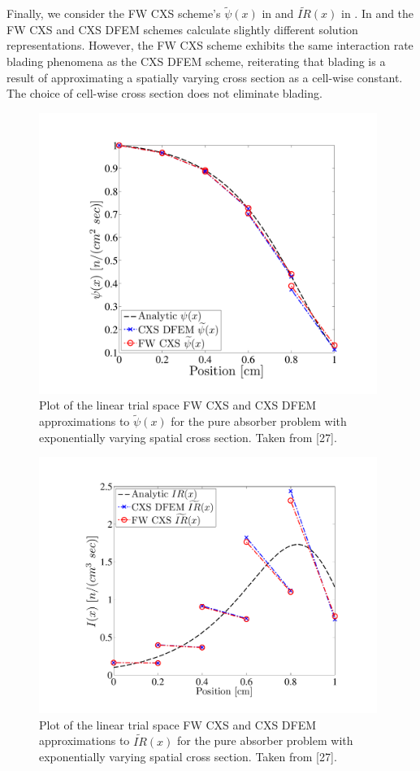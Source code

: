 Finally, we consider the FW CXS scheme's $\widetilde{\psi}(x)$ in  and $\widetilde{IR}(x)$ in .  
In  and  the FW CXS and CXS DFEM schemes calculate slightly different solution representations.
However, the FW CXS scheme  exhibits the same interaction rate blading phenomena as the CXS DFEM scheme, reiterating that blading is a result of approximating a spatially varying cross section as a cell-wise constant.
The choice of cell-wise cross section does not eliminate blading.
\begin{figure}[!htp]
\centering
\includegraphics[width=11cm,trim=1.25in  0.4in 1in 0.75in,clip=true]{chapter3_variable_xs/FW_Psi_Blades.pdf}
\caption{Plot of the linear trial space FW CXS and CXS DFEM approximations to $\widetilde{\psi}(x)$ for the pure absorber problem with exponentially varying spatial cross section.  Taken from [27].}
\label{fig:fw_blading_psi}
\end{figure}
%
%
\begin{figure}[!htp]
\centering
\includegraphics[width=11cm,trim=1in  0.4in 1.25in 0.75in,clip=true]{chapter3_variable_xs/FW_I_Blades.pdf}
\caption{Plot of the linear trial space FW CXS and CXS DFEM approximations to $\widetilde{IR}(x)$ for the pure absorber problem with exponentially varying spatial cross section.  Taken from [27].}
\label{fig:fw_blading_ir}
\end{figure}
%
%
%
